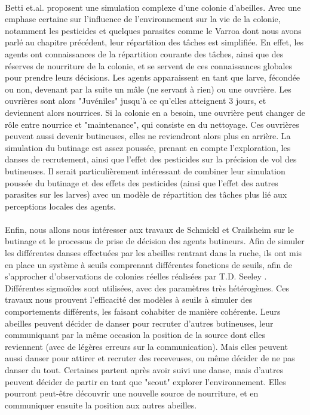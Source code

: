         \paragraph{}
        Betti et.al. \cite{betti_bee_2017} proposent une simulation complexe d'une colonie d'abeilles. Avec une emphase certaine sur l'influence de l'environnement sur la vie de la colonie, notamment les pesticides et quelques parasites comme le Varroa dont nous avons parlé au chapitre précédent, leur répartition des tâches est simplifiée. En effet, les agents ont connaissances de la répartition courante des tâches, ainsi que des réserves de nourriture de la colonie, et se servent de ces connaissances globales pour prendre leurs décisions.
         Les agents apparaissent en tant que larve, fécondée ou non, devenant par la suite un mâle (ne servant à rien) ou une ouvrière. Les ouvrières sont alors "Juvéniles" jusqu'à ce qu'elles atteignent 3 jours, et deviennent alors nourrices. Si la colonie en a besoin, une ouvrière peut changer de rôle entre nourrice et "maintenance", qui consiste en du nettoyage. Ces ouvrières peuvent aussi devenir butineuses, elles ne reviendront alors plus en arrière.
         La simulation du butinage est assez poussée, prenant en compte l'exploration, les danses de recrutement, ainsi que l'effet des pesticides sur la précision de vol des butineuses. Il serait particulièrement intéressant de combiner leur simulation poussée du butinage et des effets des pesticides (ainsi que l'effet des autres parasites sur les larves) avec un modèle de répartition des tâches plus lié aux perceptions locales des agents.
        
        \paragraph{}
        Enfin, nous allons nous intéresser aux travaux de Schmickl et Crailsheim \cite{schmickl_costs_2004} sur le butinage et le processus de prise de décision des agents butineurs. Afin de simuler les différentes danses effectuées par les abeilles rentrant dans la ruche, ils ont mis en place un système à seuils comprenant différentes fonctions de seuils, afin de s'approcher d'observations de colonies réelles réalisées par T.D. Seeley \cite{seeley_tremble_1992}. Différentes sigmoïdes sont utilisées, avec des paramètres très hétérogènes. Ces travaux nous prouvent l'efficacité des modèles à seuils à simuler des comportements différents, les faisant cohabiter de manière cohérente. Leurs abeilles peuvent décider de danser pour recruter d'autres butineuses, leur communiquant par la même occasion la position de la source dont elles reviennent (avec de légères erreurs sur la communication). Mais elles peuvent aussi danser pour attirer et recruter des receveuses, ou même décider de ne pas danser du tout. Certaines partent après avoir suivi une danse, mais d'autres peuvent décider de partir en tant que "scout" explorer l'environnement. Elles pourront peut-être découvrir une nouvelle source de nourriture, et en communiquer ensuite la position aux autres abeilles.
        
